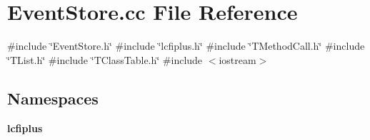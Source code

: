 \section{Event\+Store.\+cc File Reference}
\label{EventStore_8cc}
{\ttfamily \#include \char`\"{}Event\+Store.\+h\char`\"{}}\newline
{\ttfamily \#include \char`\"{}lcfiplus.\+h\char`\"{}}\newline
{\ttfamily \#include \char`\"{}T\+Method\+Call.\+h\char`\"{}}\newline
{\ttfamily \#include \char`\"{}T\+List.\+h\char`\"{}}\newline
{\ttfamily \#include \char`\"{}T\+Class\+Table.\+h\char`\"{}}\newline
{\ttfamily \#include $<$iostream$>$}\newline
\subsection*{Namespaces}
\begin{DoxyCompactItemize}
\item 
 \textbf{ lcfiplus}
\end{DoxyCompactItemize}
